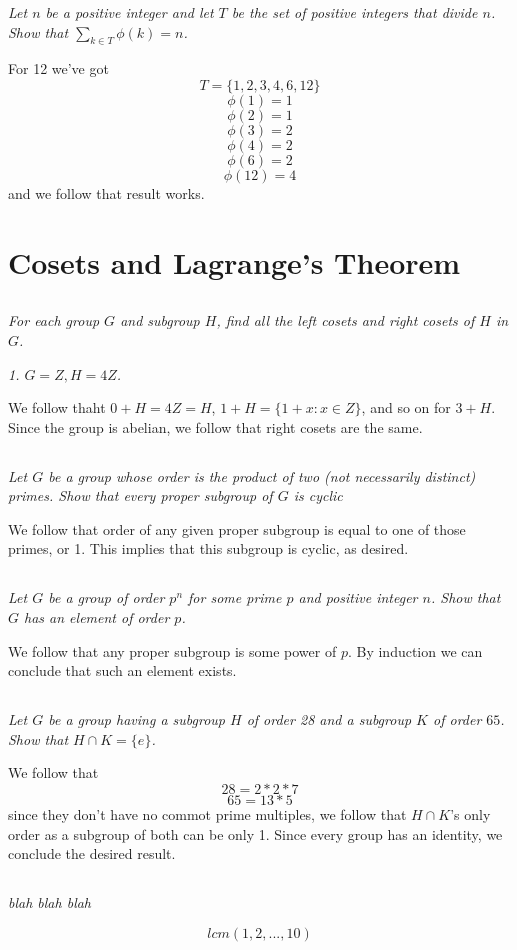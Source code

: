 \documentclass[11pt,oneside,titlepage]{book}
\newcommand{\set}[1]{\{ #1 \}}
\begin{document}
\textit{Let $n$ be a positive integer and let $T$ be the set of positive integers
  that divide $n$. Show that $\sum_{k \in T}{\phi(k)} = n$.}

For 12 we've got
$$T = \set{1, 2, 3, 4, 6, 12}$$
$$\phi(1) = 1$$
$$\phi(2) = 1$$
$$\phi(3) = 2$$
$$\phi(4) = 2$$
$$\phi(6) = 2$$
$$\phi(12) = 4$$
and we follow that result works.

\section{Cosets and Lagrange's Theorem}

\subsection{}

\textit{For each group $G$ and subgroup $H$, find all the left cosets and right cosets
  of $H$ in $G$.}

\textit{1. $G = Z, H = 4Z$.}

We follow thaht $0 + H = 4Z = H$, $1 + H = \set{1 + x: x \in Z}$, and so on for $3 + H$.
Since the group is abelian, we follow that right cosets are the same.

\subsection{}

\textit{Let $G$ be a group whose order is the product of two (not necessarily distinct)
  primes. Show that every proper subgroup of $G$ is cyclic}

We follow that order of any given proper subgroup is equal to one of those primes, or 1. 
This implies that this subgroup is cyclic, as desired.

\subsection{}

\textit{Let $G$ be a group of order $p^n$ for some prime $p$ and positive integer $n$.
  Show that $G$ has an element of order $p$.}

We follow that any proper subgroup is some power of $p$. By induction we can conclude that
such an element exists.

\subsection{}

\textit{Let $G$ be a group having a subgroup $H$ of order 28 and a
  subgroup $K$ of order $65$. Show that $H \cap K = \set{e}$.}

We follow that
$$28 = 2 * 2 * 7$$
$$65 = 13 * 5$$
since they don't have no commot prime multiples, we follow that $H \cap K$'s only order
as a subgroup of both can be only 1. Since every group has an identity, we
conclude the desired result.

\subsection{}

\textit{blah blah blah}

$$lcm(1, 2, ..., 10)$$
\end{document}
